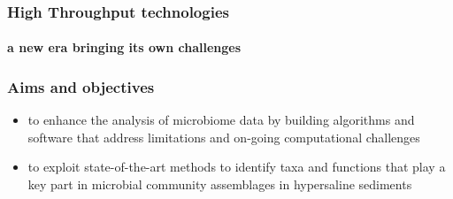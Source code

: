 \documentclass{beamer}
\begin{document}
   \begin{frame}
      \frametitle{High Throughput technologies}
      \framesubtitle{a new era bringing its own challenges}

      \begin{singlespace}
      \end{singlespace}
   \end{frame}

   \begin{frame}
      \frametitle{Aims and objectives}
      \begin{itemize}
         \item \small to enhance the analysis of microbiome data by building algorithms and software
         that address limitations and on-going computational challenges
         \bigskip
         \item  to exploit state-of-the-art methods to identify taxa and functions that play a key
         part in microbial community assemblages in hypersaline sediments
         
      \end{itemize}
   \end{frame}
\end{document}
